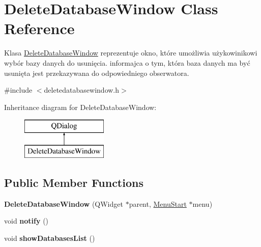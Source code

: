 \hypertarget{class_delete_database_window}{}\section{Delete\+Database\+Window Class Reference}
\label{class_delete_database_window}


Klasa \mbox{\hyperlink{class_delete_database_window}{Delete\+Database\+Window}} reprezentuje okno, które umożliwia użykowinikowi wybór bazy danych do usunięcia. informajca o tym, która baza danych ma być usunięta jest przekazywana do odpowiedniego obserwatora.  




{\ttfamily \#include $<$deletedatabasewindow.\+h$>$}

Inheritance diagram for Delete\+Database\+Window\+:\begin{figure}[H]
\begin{center}
\leavevmode
\includegraphics[height=2.000000cm]{class_delete_database_window}
\end{center}
\end{figure}
\subsection*{Public Member Functions}
\begin{DoxyCompactItemize}
\item 
\mbox{\label{class_delete_database_window_ad7444fa62ecdc1353ba6a732b2032c9f}} 
{\bfseries Delete\+Database\+Window} (Q\+Widget $\ast$parent, \mbox{\hyperlink{class_menu_start}{Menu\+Start}} $\ast$menu)
\item 
\mbox{\label{class_delete_database_window_a79ea3f315e503959e6ed994c51fb2766}} 
void {\bfseries notify} ()
\item 
\mbox{\label{class_delete_database_window_a0e0acab9961e2466c1238fb03d050816}} 
void {\bfseries show\+Databases\+List} ()
\end{DoxyCompactItemize}


